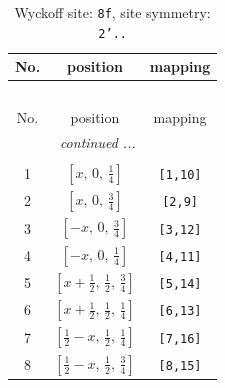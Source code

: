 \documentclass[fleqn,8pt]{jsarticle}
\begin{document}
\begin{longtable}{ccc}
\caption{Wyckoff site: {\tt 8f}, site symmetry: {\tt 2'..}}
 \\
 \hline \hline
No. & position & mapping \\ \hline \endfirsthead

\multicolumn{2}{l}{\tablename\ \thetable{}} \\
 \hline \hline
No. & position & mapping \\ \hline \endhead

 \hline \hline
\multicolumn{2}{r}{\footnotesize\it continued ...} \\ \endfoot

 \hline \hline
\multicolumn{2}{r}{} \\ \endlastfoot

1 & $\left[ x,\, 0,\, \frac{1}{4} \right]$ & {\tt [1,10]} \\ \hline
2 & $\left[ x,\, 0,\, \frac{3}{4} \right]$ & {\tt [2,9]} \\ \hline
3 & $\left[ - x,\, 0,\, \frac{3}{4} \right]$ & {\tt [3,12]} \\ \hline
4 & $\left[ - x,\, 0,\, \frac{1}{4} \right]$ & {\tt [4,11]} \\ \hline
5 & $\left[ x + \frac{1}{2},\, \frac{1}{2},\, \frac{3}{4} \right]$ & {\tt [5,14]} \\ \hline
6 & $\left[ x + \frac{1}{2},\, \frac{1}{2},\, \frac{1}{4} \right]$ & {\tt [6,13]} \\ \hline
7 & $\left[ \frac{1}{2} - x,\, \frac{1}{2},\, \frac{1}{4} \right]$ & {\tt [7,16]} \\ \hline
8 & $\left[ \frac{1}{2} - x,\, \frac{1}{2},\, \frac{3}{4} \right]$ & {\tt [8,15]} \\
\end{longtable}
\renewcommand{\arraystretch}{1.2}
\end{document}
